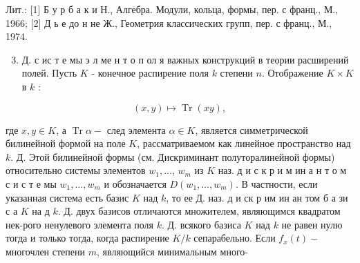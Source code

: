 \documentclass[10pt]{article}
\begin{document}
Лит.: [1] Б у р б а к и Н., Алгебра. Модули, кольца, формы, пер. с франц., М., 1966; [2] Д ь е до н не Ж., Геометрия классических групп, пер. с франц., М., 1974.



\begin{enumerate}

  \setcounter{enumi}{2}

  \item Д. с ис т е мы э л ме н т о п ол я важных конструкций в теории расширений полей. Пусть $K$ - конечное распирение поля $k$ степени $n$. Отображение $K \times K$ в $k$ :

\end{enumerate}



\[

(x, y) \mapsto \operatorname{Tr}(x y),

\]



где $x, y \in K$, а $\operatorname{Tr} \alpha-$ след элемента $\alpha \in K$, является симметрической билинейной формой на поле $K$, рассматриваемом как линейное пространство над $k$. Д. Этой билинейной формы (см. Дискриминант полуторалинейной формы) относительно системы элементов $w_{1}, \ldots$, $w_{m}$ из $K$ наз. д и с к р и м ин а н т о м с и с т е мы $w_{1}, \ldots, w_{m}$ и обозначается $D\left(w_{1}, \ldots, w_{m}\right)$. В частности, если указанная система есть базис $K$ над $k$, то ее Д. наз. д и ск р им ин ан том б а зи с а $K$ на д $k$. Д. двух базисов отличаются множителем, являющимся квадратом нек-рого ненулевого элемента поля $k$. Д. всякого базиса $K$ над $k$ не равен нулю тогда и только тогда, когда распирение $K / k$ сепарабельно. Если $f_{x}(t)-$ многочлен степени $m$, являющийся минимальным много-
\end{document}
